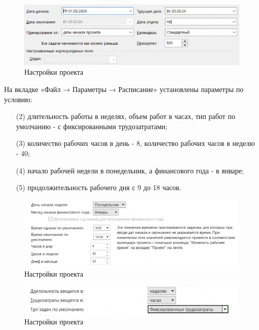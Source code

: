 \begin{figure}[h!]
	\begin{center}
		\includegraphics[scale=0.65]{inc/img/p_4.png}
	\end{center}
	\captionsetup{justification=centering}
	\caption{Настройки проекта}
	\label{fig:u3}
\end{figure}

\newpage

На вкладке «Файл → Параметры → Расписание» установлены параметры по
условию:
\begin{itemize}
    \item[(2)] длительность работы в неделях, объем работ в часах, тип работ по
умолчанию - с фиксированными трудозатратами;
    \item[(3)] количество рабочих часов в день - 8, количество рабочих часов в
неделю - 40;
    \item[(4)] начало рабочей недели в понедельник, а финансового года - в январе;
    \item[(5)] продолжительность рабочего дня с 9 до 18 часов.
\end{itemize}

\begin{figure}[h!]
	\begin{center}
		\includegraphics[scale=0.55]{inc/img/p_6.png}
	\end{center}
	\captionsetup{justification=centering}
	\caption{Настройки проекта}
	\label{fig:u3}
\end{figure}

\begin{figure}[h!]
	\begin{center}
		\includegraphics[scale=0.6]{inc/img/p_5.png}
	\end{center}
	\captionsetup{justification=centering}
	\caption{Настройки проекта}
	\label{fig:u3}
\end{figure}

